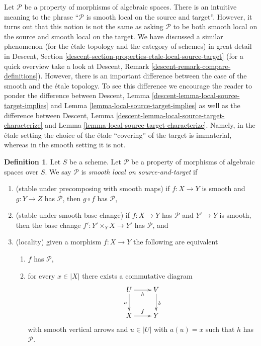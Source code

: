 \documentclass{stacks-project}
\theoremstyle{plain}
\theoremstyle{definition}
\newtheorem{definition}[subsection]{Definition}
\theoremstyle{remark}
\numberwithin{equation}{subsection}
\begin{document}
\noindent
Let $\mathcal{P}$ be a property of morphisms of algebraic spaces. There is an
intuitive meaning to the phrase ``$\mathcal{P}$ is smooth local on the
source and target''. However, it turns out that this notion is not
the same as asking $\mathcal{P}$ to be both smooth
local on the source and smooth local on the target.
We have discussed a similar phenomenon (for the \'etale topology and
the category of schemes) in great detail in
Descent, Section \ref{descent-section-properties-etale-local-source-target}
(for a quick overview take a look at
Descent, Remark \ref{descent-remark-compare-definitions}).
However, there is an important difference between the case of the smooth
and the \'etale topology. To see this difference we encourage the reader
to ponder the difference between
Descent, Lemma \ref{descent-lemma-local-source-target-implies}
and
Lemma \ref{lemma-local-source-target-implies}
as well as the difference between
Descent, Lemma \ref{descent-lemma-local-source-target-characterize}
and
Lemma \ref{lemma-local-source-target-characterize}.
Namely, in the \'etale setting the choice of the \'etale ``covering'' of the
target is immaterial, whereas in the smooth setting it is not.

\begin{definition}
\label{definition-local-source-target}
Let $S$ be a scheme.
Let $\mathcal{P}$ be a property of morphisms of algebraic spaces over $S$.
We say $\mathcal{P}$ is {\it smooth local on source-and-target} if
\begin{enumerate}
\item (stable under precomposing with smooth maps)
if $f : X \to Y$ is smooth and $g : Y \to Z$ has $\mathcal{P}$,
then $g \circ f$ has $\mathcal{P}$,
\item (stable under smooth base change)
if $f : X \to Y$ has $\mathcal{P}$ and $Y' \to Y$ is smooth, then
the base change $f' : Y' \times_Y X \to Y'$ has $\mathcal{P}$, and
\item (locality) given a morphism $f : X \to Y$ the following are
equivalent
\begin{enumerate}
\item $f$ has $\mathcal{P}$,
\item for every $x \in |X|$ there exists a commutative diagram
$$
\xymatrix{
U \ar[d]_a \ar[r]_h & V \ar[d]^b \\
X \ar[r]^f & Y
}
$$
with smooth vertical arrows and $u \in |U|$ with $a(u) = x$ such that
$h$ has $\mathcal{P}$.
\end{enumerate}
\end{enumerate}
\end{definition}
\end{document}

